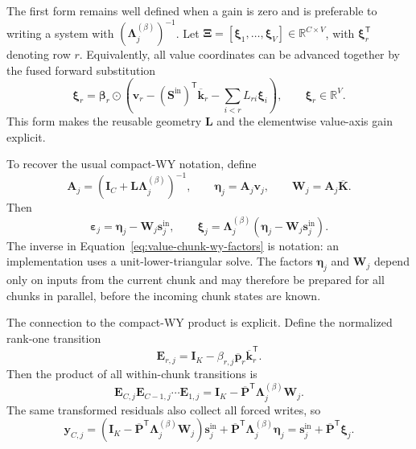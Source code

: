 \documentclass[11pt]{article}
\newcommand{\R}{\mathbb{R}}
\newcommand{\ve}[1]{\boldsymbol{#1}}
\newcommand{\tr}{\mathsf{T}}
\begin{document}
The first form remains well defined when a gain is zero and is preferable to writing a system
with $(\ve{\Lambda}^{(\beta)}_j)^{-1}$.
Let $\ve{\Xi}=[\ve{\xi}_1,\ldots,\ve{\xi}_V]\in\R^{C\times V}$, with
$\ve{\xi}_r^{\tr}$ denoting row $r$.  Equivalently, all value coordinates can be advanced together
by the fused forward substitution
\begin{equation}
  \ve{\xi}_r
  =\ve{\beta}_r\odot
   \left(
     \ve{v}_r-(\ve{S}^{\mathrm{in}})^{\tr}\overline{\ve{k}}_r
     -\sum_{i<r}L_{ri}\ve{\xi}_i
   \right),
  \qquad
  \ve{\xi}_r\in\R^V.
  \label{eq:value-chunk-fused-substitution}
\end{equation}
This form makes the reusable geometry $\ve{L}$ and the elementwise value-axis gain explicit.

To recover the usual compact-WY notation, define
\begin{equation}
  \ve{A}_j=(\ve{I}_C+\ve{L}\ve{\Lambda}^{(\beta)}_j)^{-1},
  \qquad
  \ve{\eta}_j=\ve{A}_j\ve{v}_j,
  \qquad
  \ve{W}_j=\ve{A}_j\overline{\ve{K}}.
  \label{eq:value-chunk-wy-factors}
\end{equation}
Then
\begin{equation}
  \ve{\varepsilon}_j
  =\ve{\eta}_j-\ve{W}_j\ve{s}^{\mathrm{in}}_j,
  \qquad
  \ve{\xi}_j
  =\ve{\Lambda}^{(\beta)}_j
   (\ve{\eta}_j-\ve{W}_j\ve{s}^{\mathrm{in}}_j).
  \label{eq:value-chunk-wy-residual}
\end{equation}
The inverse in Equation~\eqref{eq:value-chunk-wy-factors} is notation: an implementation uses a
unit-lower-triangular solve.  The factors $\ve{\eta}_j$ and $\ve{W}_j$ depend only on inputs from the
current chunk and may therefore be prepared for all chunks in parallel, before the incoming chunk
states are known.

The connection to the compact-WY product is explicit.  Define the normalized rank-one transition
\begin{equation}
  \ve{E}_{r,j}
  =\ve{I}_K
   -\beta_{r,j}\overline{\ve{p}}_r\overline{\ve{k}}_r^{\tr}.
  \label{eq:value-chunk-rank-one-transition}
\end{equation}
Then the product of all within-chunk transitions is
\begin{equation}
  \ve{E}_{C,j}\ve{E}_{C-1,j}\cdots\ve{E}_{1,j}
  =\ve{I}_K
   -\overline{\ve{P}}^{\tr}
    \ve{\Lambda}^{(\beta)}_j\ve{W}_j.
  \label{eq:value-chunk-compact-wy-identity}
\end{equation}
The same transformed residuals also collect all forced writes, so
\begin{equation}
  \ve{y}_{C,j}
  =\left(
     \ve{I}_K
     -\overline{\ve{P}}^{\tr}
      \ve{\Lambda}^{(\beta)}_j\ve{W}_j
   \right)\ve{s}^{\mathrm{in}}_j
   +\overline{\ve{P}}^{\tr}
    \ve{\Lambda}^{(\beta)}_j\ve{\eta}_j
  =\ve{s}^{\mathrm{in}}_j+\overline{\ve{P}}^{\tr}\ve{\xi}_j.
  \label{eq:value-chunk-compact-wy-state}
\end{equation}
\end{document}
